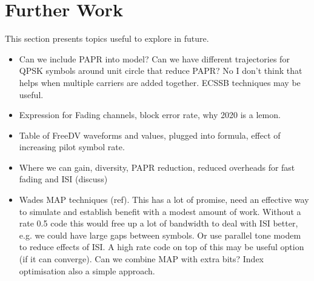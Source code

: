 \documentclass{article}
\begin{document}
\section{Further Work}

This section presents topics useful to explore in future.

\begin{itemize}
\item Can we include PAPR into model? Can we have different trajectories for QPSK symbols around unit circle that reduce PAPR?  No I don't think that helps when multiple carriers are added together.  ECSSB techniques may be useful.
\item Expression for Fading channels, block error rate, why 2020 is a lemon.
\item Table of FreeDV waveforms and values, plugged into formula, effect of increasing pilot symbol rate.
\item Where we can gain, diversity, PAPR reduction, reduced overheads for fast fading and ISI (discuss)
\item Wades MAP techniques (ref).  This has a lot of promise, need an effective way to simulate and establish benefit with a modest amount of work.  Without a rate 0.5 code this would free up a lot of bandwidth to deal with ISI better, e.g. we could have large gaps between symbols.  Or use parallel tone modem to reduce effects of ISI.  A high rate code on top of this may be useful option (if it can converge).   Can we combine MAP with extra bits?  Index optimisation also a simple approach.
\end{itemize} 



\end{document}
